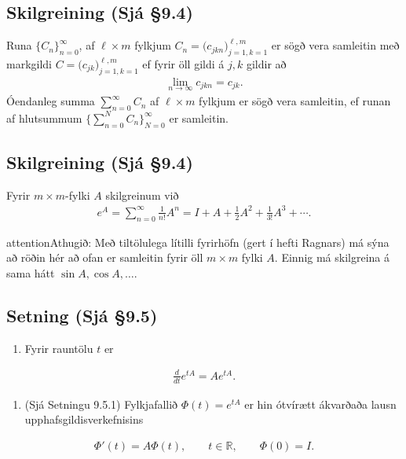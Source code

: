 \documentclass[a4paper,10pt,icelandic]{sphinxmanual}
\begin{document}
\subsection{Skilgreining (Sjá \S{}9.4)}
\label{\detokenize{Kafli09:skilgreining-sja-9-4}}
Runa \(\{C_n\}_{n=0}^\infty\), af \(\ell\times m\) fylkjum \(C_n=\big(c_{jkn}\big)_{j=1,k=1}^{\ell, m}\) er sögð vera samleitin með markgildi \(C=\big(c_{jk}\big)_{j=1,k=1}^{\ell, m}\) ef fyrir öll gildi á \(j, k\) gildir að
\begin{equation*}
\begin{split}\lim\limits_{n\to\infty}c_{jkn}=c_{jk}.\end{split}
\end{equation*}
Óendanleg summa \(\sum_{n=0}^\infty C_n\) af \(\ell\times m\) fylkjum er sögð vera samleitin, ef runan af hlutsummum \(\{\sum_{n=0}^N C_n\}_{N=0}^\infty\) er samleitin.


\subsection{Skilgreining (Sjá \S{}9.4)}
\label{\detokenize{Kafli09:id5}}
Fyrir \(m\times m\)-fylki \(A\) skilgreinum við
\begin{equation*}
\begin{split}e^A=\sum_{n=0}^\infty \frac{1}{n!}A^n=I+A+\frac{1}{2}A^2+\frac{1}{3!}A^3+\cdots.\end{split}
\end{equation*}
\begin{sphinxadmonition}{attention}{Athugið:}
Með tiltölulega lítilli fyrirhöfn (gert í hefti Ragnars) má sýna að röðin hér að ofan er samleitin fyrir öll \(m\times m\) fylki \(A\). Einnig má skilgreina á sama hátt \(\sin A, \cos A, \ldots\).
\end{sphinxadmonition}


\subsection{Setning (Sjá \S{}9.5)}
\label{\detokenize{Kafli09:setning-sja-9-5}}\begin{enumerate}
%
\item {} 
Fyrir rauntölu \(t\) er

\end{enumerate}
\begin{equation*}
\begin{split}\frac{d}{dt}e^{tA}=Ae^{tA}.\end{split}
\end{equation*}\begin{enumerate}
%
\setcounter{enumi}{1}
\item {} 
(Sjá Setningu 9.5.1) Fylkjafallið \(\Phi(t)= e^{tA}\) er hin ótvírætt ákvarðaða lausn upphafsgildisverkefnisins

\end{enumerate}
\begin{equation*}
\begin{split}\Phi'(t) = A\Phi(t), \qquad t\in \mathbb{R}, \qquad \Phi(0)=I.\end{split}
\end{equation*}
\end{document}
